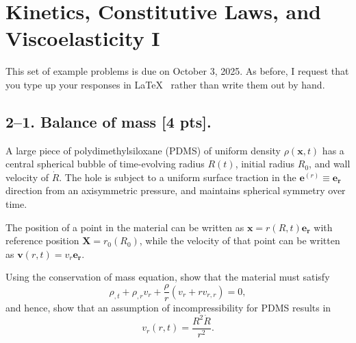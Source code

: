 \setcounter{section}{1} %

\section{Kinetics, Constitutive Laws, and Viscoelasticity I}
\label{PS2}

This set of example problems is due on October 3, 2025. 
As before, I request that you type up your responses in \LaTeX~ rather than write them out by hand. 

\medskip
\subsection*{2--1. \textbf{Balance of mass} [4 pts].} 
A large piece of polydimethylsiloxane (PDMS) of uniform density $\rho(\bm{x},t)$ has a central spherical bubble of time-evolving radius $R(t)$, initial radius $R_0$, and wall velocity of $\dot{R}$. 
The hole is subject to a uniform surface traction in the $\bm{e}^{(r)} \equiv \bm{e}_{\bm{r}}$ direction from an axisymmetric pressure, and maintains spherical symmetry over time. 

\medskip
The position of a point in the material can be written as $\bm{x} = r(R,t) \bm{e}_{\bm{r}}$ with reference position $\bm{X} = r_0(R_0)$, while the velocity of that point can be written as $\bm{v}(r,t) = v_r \bm{e}_{\bm{r}}$.

\medskip
Using the conservation of mass equation, show that the material must satisfy
\begin{equation*}
\rho_{,t}+ \rho_{,r} v_r + \frac{\rho}{r} (v_r + r v_{r,r}) = 0,
\end{equation*}
and hence, show that an assumption of incompressibility for PDMS results in 
\begin{equation*}
v_r(r,t) = \frac{R^2 \dot{R}}{r^2}.
\end{equation*}

